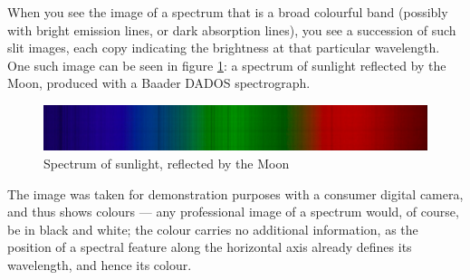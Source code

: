 \documentclass[twocolumn,apj]{openjournal}
\begin{document}
When you see the image of a spectrum that is a broad colourful band (possibly with bright emission lines, or dark absorption lines), you see a succession of such slit images, each copy indicating the brightness at that particular wavelength. One such image can be seen in figure \ref{SampleSpectrum}: a spectrum of sunlight reflected by the Moon, produced with a Baader DADOS spectrograph.	
\begin{figure}[htbp]
\begin{center}
\includegraphics[width=\linewidth]{spektrum.jpg}
\caption{Spectrum of sunlight, reflected by the Moon}
\label{SampleSpectrum}
\end{center}
\end{figure}
The image was taken for demonstration purposes with a consumer digital camera, and thus shows colours --- any professional image of a spectrum would, of course, be in black and white; the colour carries no additional information, as the position of a spectral feature along the horizontal axis already defines its wavelength, and hence its colour.
\end{document}
